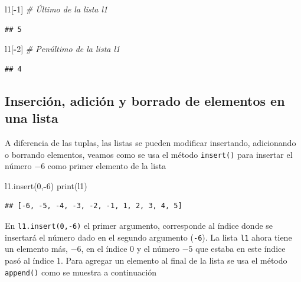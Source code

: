 \documentclass[
]{book}
\newenvironment{Shaded}{\begin{snugshade}}{\end{snugshade}}
\newcommand{\BuiltInTok}[1]{#1}
\newcommand{\CommentTok}[1]{\textcolor[rgb]{0.56,0.35,0.01}{\textit{#1}}}
\newcommand{\DecValTok}[1]{\textcolor[rgb]{0.00,0.00,0.81}{#1}}
\newcommand{\NormalTok}[1]{#1}
\newcommand{\OperatorTok}[1]{\textcolor[rgb]{0.81,0.36,0.00}{\textbf{#1}}}
\theoremstyle{definition}
\theoremstyle{definition}
\theoremstyle{definition}
\theoremstyle{definition}
\theoremstyle{remark}
\begin{document}
\begin{Shaded}
\begin{Highlighting}[]
\NormalTok{l1[}\OperatorTok{{-}}\DecValTok{1}\NormalTok{] }\CommentTok{\# Último de la lista l1}
\end{Highlighting}
\end{Shaded}

\begin{verbatim}
## 5
\end{verbatim}

\begin{Shaded}
\begin{Highlighting}[]
\NormalTok{l1[}\OperatorTok{{-}}\DecValTok{2}\NormalTok{] }\CommentTok{\# Penúltimo  de la lista l1}
\end{Highlighting}
\end{Shaded}

\begin{verbatim}
## 4
\end{verbatim}

\hypertarget{inserciuxf3n-adiciuxf3n-y-borrado-de-elementos-en-una-lista}{%
\subsection{Inserción, adición y borrado de elementos en una lista}\label{inserciuxf3n-adiciuxf3n-y-borrado-de-elementos-en-una-lista}}

A diferencia de las tuplas, las listas se pueden modificar insertando, adicionando o borrando elementos, veamos como se usa el método \texttt{insert()} para insertar el número \(-6\) como primer elemento de la lista

\begin{Shaded}
\begin{Highlighting}[]
\NormalTok{l1.insert(}\DecValTok{0}\NormalTok{,}\OperatorTok{{-}}\DecValTok{6}\NormalTok{)}
\BuiltInTok{print}\NormalTok{(l1)}
\end{Highlighting}
\end{Shaded}

\begin{verbatim}
## [-6, -5, -4, -3, -2, -1, 1, 2, 3, 4, 5]
\end{verbatim}

En \texttt{l1.insert(0,-6)} el primer argumento, corresponde al índice donde se insertará el número dado en el segundo argumento (\texttt{-6}). La lista \texttt{l1} ahora tiene un elemento más, \(-6\), en el índice 0 y el número \(-5\) que estaba en este índice pasó al índice 1. Para agregar un elemento al final de la lista se usa el método \texttt{append()} como se muestra a continuación
\end{document}
